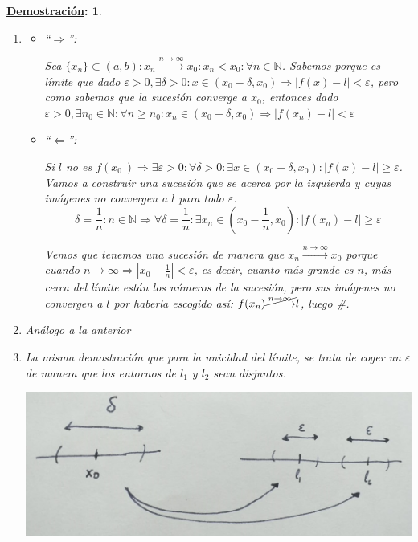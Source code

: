 \documentclass[10pt,a4paper,openright]{book}
\theoremstyle{break}
\newtheorem*{demo}{\underline{Demostración}:}
\begin{document}
\begin{demo}
\begin{enumerate}
\item 
	\begin{itemize}
	\item ``$\Rightarrow$'':\par
	Sea $\{x_n\}\subset (a,b):  x_n\xrightarrow{n\rightarrow \infty} x_0: x_n< x_0: \forall n\in \mathbb N$. Sabemos porque es límite que dado $\varepsilon>0, \exists \delta>0: x\in(x_0-\delta, x_0)\Rightarrow |f(x)-l|<\varepsilon$, pero como sabemos que la sucesión converge a $x_0$, entonces dado $\varepsilon>0, \exists n_0\in \mathbb N: \forall n\geq n_0: x_n\in (x_0-\delta, x_0)\Rightarrow |f(x_n)-l|<\varepsilon$
	
	\item ``$\Leftarrow$'':\par
	Si $l$ no es $f(x_0^-)\Rightarrow \exists \varepsilon>0:\forall \delta>0: \exists x\in(x_0-\delta, x_0): |f(x)-l|\geq \varepsilon$. Vamos a construir una sucesión que se acerca por la izquierda y cuyas imágenes no convergen a $l$ para todo $\varepsilon$.
	$$\delta=\frac{1}{n}: n\in \mathbb N \Rightarrow \forall \delta=\frac{1}{n} : \exists x_n\in \left(x_0-\frac{1}{n}, x_0\right): |f(x_n)-l|\geq \varepsilon $$
	
	Vemos que tenemos una sucesión de manera que $ x_n\xrightarrow{n\rightarrow \infty} x_0$ porque cuando $n\rightarrow \infty\Rightarrow |x_0-\frac{1}{n}|<\varepsilon$, es decir, cuanto más grande es $n$, más cerca del límite están los números de la sucesión, pero sus imágenes no convergen a $l$ por haberla escogido así: $f(x_n)\cancel{\xrightarrow{n\rightarrow \infty}}l$, luego \#.
	\end{itemize}
	
\item Análogo a la anterior

\item La misma demostración que para la unicidad del límite, se trata de coger un $\varepsilon$ de manera que los entornos de $l_1$ y $l_2$ sean disjuntos.

\begin{center}
\includegraphics[scale=0.25]{unicidad limite lateral}
\end{center}

\end{enumerate}
\end{demo}
\end{document}
